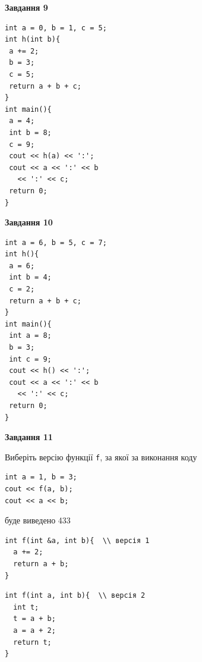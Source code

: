 \documentclass[12pt, ukrainian]{article}
\def\code#1{\Verb!#1!}
\begin{document}
{\begin {large}
\begin{minipage}[t]{11.0cm}
\end{minipage}


\begin{minipage}[t]{7.0cm}

\begin{center}
\textbf{Завдання 9}
\end{center}
\vspace{-8mm}

\begin{verbatim}
int a = 0, b = 1, c = 5;
int h(int b){
 a += 2;
 b = 3;
 c = 5;
 return a + b + c;
}
int main(){
 a = 4;
 int b = 8;
 c = 9;
 cout << h(a) << ':';
 cout << a << ':' << b 
   << ':' << c;
 return 0;
}
\end{verbatim}



\begin{center}
\textbf{Завдання 10}
\end{center}
\vspace{-8mm}

\begin{verbatim}
int a = 6, b = 5, c = 7;
int h(){
 a = 6;
 int b = 4;
 c = 2;
 return a + b + c;
}
int main(){
 int a = 8;
 b = 3;
 int c = 9;
 cout << h() << ':';
 cout << a << ':' << b 
   << ':' << c;
 return 0;
}
\end{verbatim}

\end{minipage}
\vline \hspace{1mm}
\begin{minipage}[t]{11.0cm}

\begin{center}
\textbf{Завдання 11}
\end{center}
Виберіть версію функції \code{f}, за якої за виконання коду
\begin{verbatim}
int a = 1, b = 3;
cout << f(a, b);
cout << a << b;
\end{verbatim}

буде виведено 433

\begin{verbatim}
int f(int &a, int b){  \\ версія 1
  a += 2;
  return a + b;
}
\end{verbatim}

\vspace{-8mm}\begin{verbatim}
int f(int a, int b){  \\ версія 2
  int t;
  t = a + b;
  a = a + 2;
  return t;
}
\end{verbatim}


\end{minipage}
\end{large}}
\end{document}
